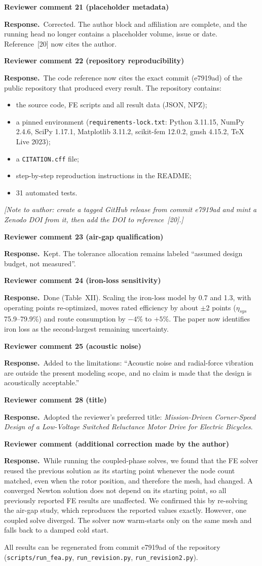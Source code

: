 \documentclass[10pt]{article}
\newcommand{\rev}[1]{\par\medskip\noindent\textbf{Reviewer comment #1}\par}
\newcommand{\resp}{\par\noindent\textcolor{blue!50!black}{\textbf{Response.}}~}
\begin{document}
\rev{21 (placeholder metadata)}
\resp Corrected. The author block and affiliation are complete, and the running
head no longer contains a placeholder volume, issue or date. Reference~[20]
now cites the author.

\rev{22 (repository reproducibility)}
\resp The code reference now cites the exact commit (e7919ad) of the public
repository that produced every result. The repository contains:
\begin{itemize}[nosep]
\item the source code, FE scripts and all result data (JSON, NPZ);
\item a pinned environment (\texttt{requirements-lock.txt}: Python 3.11.15,
NumPy 2.4.6, SciPy 1.17.1, Matplotlib 3.11.2, scikit-fem 12.0.2, gmsh 4.15.2,
TeX Live 2023);
\item a \texttt{CITATION.cff} file;
\item step-by-step reproduction instructions in the README;
\item 31 automated tests.
\end{itemize}
\emph{[Note to author: create a tagged GitHub release from commit e7919ad and
mint a Zenodo DOI from it, then add the DOI to reference~[20].]}

\rev{23 (air-gap qualification)}
\resp Kept. The tolerance allocation remains labeled ``assumed design budget,
not measured''.

\rev{24 (iron-loss sensitivity)}
\resp Done (Table~XII). Scaling the iron-loss model by 0.7 and 1.3, with
operating points re-optimized, moves rated efficiency by about $\pm$2 points
($\eta_{sys}$ 75.9--79.9\%) and route consumption by $-4$\% to $+5$\%. The
paper now identifies iron loss as the second-largest remaining uncertainty.

\rev{25 (acoustic noise)}
\resp Added to the limitations: ``Acoustic noise and radial-force vibration are
outside the present modeling scope, and no claim is made that the design is
acoustically acceptable.''

\rev{28 (title)}
\resp Adopted the reviewer's preferred title: \emph{Mission-Driven Corner-Speed
Design of a Low-Voltage Switched Reluctance Motor Drive for Electric Bicycles}.

\rev{(additional correction made by the author)}
\resp While running the coupled-phase solves, we found that the FE solver
reused the previous solution as its starting point whenever the node count
matched, even when the rotor position, and therefore the mesh, had changed. A
converged Newton solution does not depend on its starting point, so all
previously reported FE results are unaffected. We confirmed this by re-solving
the air-gap study, which reproduces the reported values exactly. However, one
coupled solve diverged. The solver now warm-starts only on the same mesh and
falls back to a damped cold start.

\bigskip
All results can be regenerated from commit e7919ad of the repository
(\texttt{scripts/run\_fea.py}, \texttt{run\_revision.py},
\texttt{run\_revision2.py}).
\end{document}

